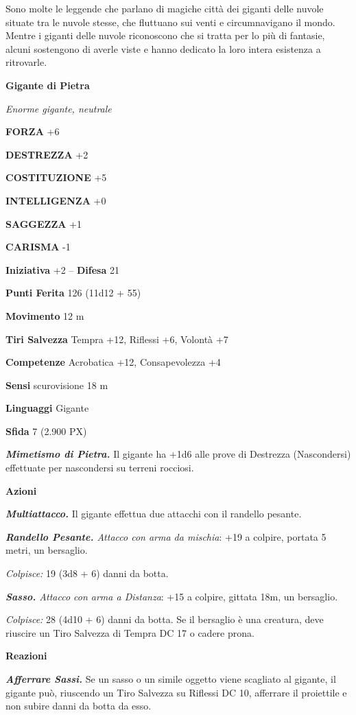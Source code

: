 \begin{multicols}{2}
Sono molte le leggende che parlano di magiche città dei giganti delle nuvole situate tra le nuvole stesse, che fluttuano sui venti e circumnavigano il mondo. Mentre i giganti delle nuvole riconoscono che si tratta per lo più di fantasie, alcuni sostengono di averle viste e hanno dedicato la loro intera esistenza a ritrovarle.


\medskip{}\textbf{Gigante di Pietra}

\textit{Enorme gigante, neutrale}

\textbf{FORZA} +6

\textbf{DESTREZZA} +2

\textbf{COSTITUZIONE} +5

\textbf{INTELLIGENZA} +0

\textbf{SAGGEZZA} +1

\textbf{CARISMA} -1

\textbf{Iniziativa} +2 -- \textbf{Difesa} 21

\textbf{Punti Ferita} 126 (11d12 + 55)

\textbf{Movimento} 12 m

\textbf{Tiri Salvezza} Tempra +12, Riflessi +6, Volontà +7

\textbf{Competenze} Acrobatica +12, Consapevolezza +4

\textbf{Sensi} scurovisione 18 m

\textbf{Linguaggi} Gigante

\textbf{Sfida} 7 (2.900 PX)

\textit{\textbf{Mimetismo di Pietra.}} Il gigante ha +1d6 alle prove di Destrezza (Nascondersi) effettuate per nascondersi su terreni rocciosi.

\textbf{Azioni}

\textit{\textbf{Multiattacco.}} Il gigante effettua due attacchi con il randello pesante.

\textit{\textbf{Randello Pesante.} Attacco con arma da mischia}: +19 a colpire, portata 5 metri, un bersaglio.

\textit{Colpisce:} 19 (3d8 + 6) danni da botta.

\textit{\textbf{Sasso.} Attacco con arma a Distanza}: +15 a colpire, gittata 18m, un bersaglio.

\textit{Colpisce:} 28 (4d10 + 6) danni da botta. Se il bersaglio è una creatura, deve riuscire un Tiro Salvezza di Tempra DC 17 o cadere prona.

\textbf{Reazioni}

\textit{\textbf{Afferrare Sassi.}} Se un sasso o un simile oggetto viene scagliato al gigante, il gigante può, riuscendo un Tiro Salvezza su Riflessi DC 10, afferrare il proiettile e non subire danni da botta da esso.


\end{multicols}
